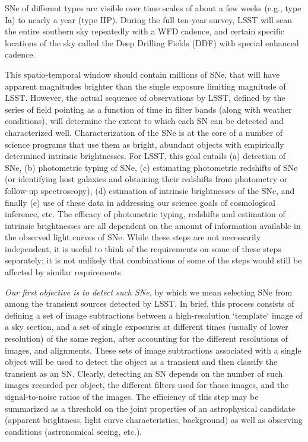 
SNe of different types are visible over time scales of about a few 
weeks (e.g., type Ia) to nearly a year (type IIP).  During the full ten-year
 survey, LSST will scan the entire southern sky repeatedly
 with a WFD cadence, and certain specific locations
of the sky called the Deep Drilling Fields (DDF) with special enhanced cadence. 

This spatio-temporal window should contain millions  of SNe, that will have apparent magnitudes brighter than the single
exposure limiting magnitude of LSST.  However, the actual sequence of
observations by LSST, defined by the series of field pointing as a
function of time in filter bands (along with weather conditions), will
determine the extent to which each SN can be detected and characterized
well.  Characterization of the SNe is at the core of a number of science
programs that use them as bright, abundant objects with empirically
determined intrinsic brightnesses. For LSST, this goal entails (a)
detection of SNe, (b) photometric typing of SNe, (c) estimating photometric
redshifts of SNe (or identifying host galaxies and obtaining their
redshifts from photometry or follow-up spectroscopy), (d) estimation of
intrinsic brightnesses of the SNe, and finally (e) use of these data in
addressing our science goals of cosmological inference, etc. The efficacy
of photometric typing, redshifts and estimation of intrinsic brightnesses
are all dependent on the amount of information available in the observed
light curves of SNe. While these steps are not necessarily independent, it
is useful to think of the requirements on some of these steps separately;
it is not unlikely  that combinations of some of the steps would still be
affected by similar requirements. 

{\emph{Our first objective is to detect such SNe}}, by which we mean
selecting SNe from among the transient sources detected by LSST.
In brief, this process consists of defining a set of image subtractions
between a high-resolution `template` image of a sky section, and a set of
single exposures at different times (usually of lower resolution) of the
same region, after accounting for the different resolutions of images, and
alignments. These sets of image subtractions associated with a single
object will be used to detect the object as a transient and then classify
the transient as an SN. Clearly, detecting an SN depends on the number of
such images recorded per object, the different filters used for those
images, and the signal-to-noise ratios of the images. %
The efficiency of this step may be summarized as a threshold on the
joint properties of an astrophysical candidate (apparent brightness, light
curve characteristics, background) as well as observing conditions
(astronomical seeing, etc.).  

